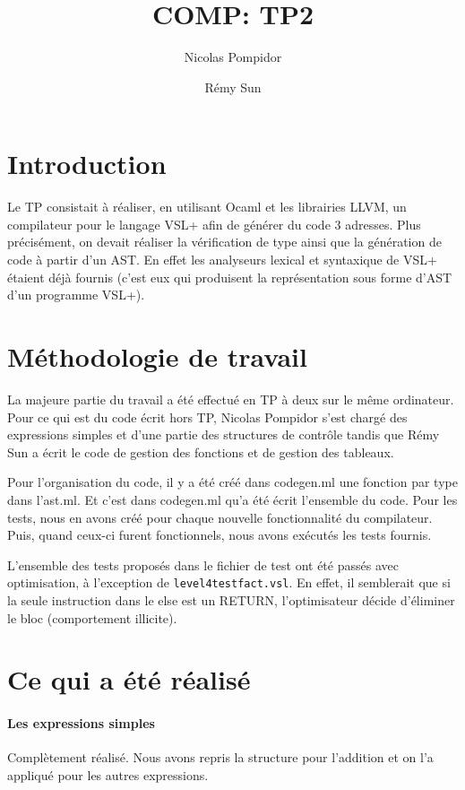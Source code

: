 \documentclass{article}
\title{COMP: TP2}
\author{Nicolas Pompidor \and Rémy Sun}
\begin{document}
\maketitle

\section{Introduction}

Le TP consistait à réaliser, en utilisant Ocaml et les librairies LLVM, un compilateur pour le 
langage VSL+ afin de générer du code 3 adresses. Plus précisément, on devait réaliser la 
vérification de type ainsi que la génération de code à partir d'un AST. En effet les analyseurs lexical 
et syntaxique de VSL+ étaient déjà fournis (c'est eux qui produisent la représentation sous forme 
d'AST d'un programme VSL+).

\section{Méthodologie de travail}

La majeure partie du travail a été effectué en TP  à deux sur le même
ordinateur. Pour ce qui est du code écrit hors TP, Nicolas Pompidor s'est chargé
des expressions simples et d'une partie des structures de contrôle tandis que
Rémy Sun a écrit le code de gestion des fonctions et de gestion des tableaux.

Pour l'organisation du code, il y a été créé dans codegen.ml une fonction par type dans 
l'ast.ml. Et c'est dans codegen.ml qu'a été écrit l'ensemble du code.
Pour les tests, nous en avons créé pour chaque nouvelle fonctionnalité du compilateur. Puis, 
quand ceux-ci furent fonctionnels, nous avons exécutés les tests fournis.

L'ensemble des tests proposés dans le fichier de test ont été passés avec
optimisation, à l'exception de \texttt{level4testfact.vsl}. En effet, il
semblerait que si la seule instruction dans le else est un RETURN,
l'optimisateur décide d'éliminer le bloc (comportement illicite).

\section{Ce qui a été réalisé}

\paragraph{Les expressions simples}
Complètement réalisé.
Nous avons repris la structure pour l'addition et on l'a appliqué pour les autres expressions.
 
\end{document}
